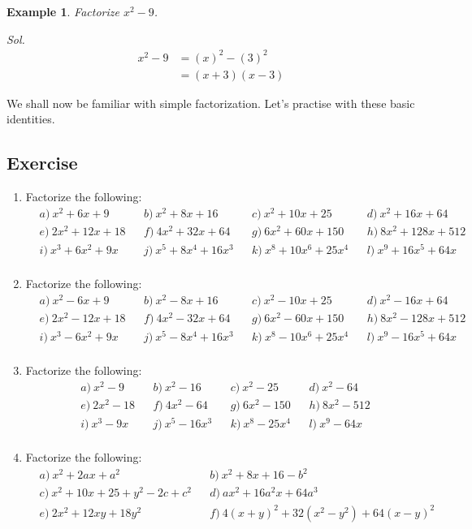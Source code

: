 \documentclass[12pt]{article}
\newtheorem{example}{Example}
\begin{document}
    \begin{example}
        Factorize $x^2-9$.
    \end{example}
    \textit{ Sol. }\begin{align*}
        x^2-9&=(x)^2-(3)^2\\
        &=(x+3)(x-3)
    \end{align*}

    We shall now be familiar with simple factorization. Let's practise with these basic identities.

    \subsection*{Exercise}
    \begin{enumerate}
        \item Factorize the following:\begin{align*}
            &a)\ x^2+6x+9&&b)\ x^2+8x+16&&c)\ x^2+10x+25&&d)\ x^2+16x+64\\
            &e)\ 2x^2+12x+18&&f)\ 4x^2+32x+64&&g)\ 6x^2+60x+150&&h)\ 8x^2+128x+512\\
            &i)\ x^3+6x^2+9x&&j)\ x^5+8x^4+16x^3&&k)\ x^8+10x^6+25x^4&&l)\ x^9+16x^5+64x\\
        \end{align*}
        \item Factorize the following:\begin{align*}
            &a)\ x^2-6x+9&&b)\ x^2-8x+16&&c)\ x^2-10x+25&&d)\ x^2-16x+64\\
            &e)\ 2x^2-12x+18&&f)\ 4x^2-32x+64&&g)\ 6x^2-60x+150&&h)\ 8x^2-128x+512\\
            &i)\ x^3-6x^2+9x&&j)\ x^5-8x^4+16x^3&&k)\ x^8-10x^6+25x^4&&l)\ x^9-16x^5+64x\\
        \end{align*}
        \item Factorize the following:\begin{align*}
            &a)\ x^2-9&&b)\ x^2-16&&c)\ x^2-25&&d)\ x^2-64\\
            &e)\ 2x^2-18&&f)\ 4x^2-64&&g)\ 6x^2-150&&h)\ 8x^2-512\\
            &i)\ x^3-9x&&j)\ x^5-16x^3&&k)\ x^8-25x^4&&l)\ x^9-64x\\
        \end{align*}
        \item Factorize the following:\begin{align*}
            &a)\ x^2+2ax+a^2&&b)\ x^2+8x+16-b^2\\
            &c)\ x^2+10x+25+y^2-2c+c^2&&d)\ ax^2+16a^2x+64a^3\\
            &e)\ 2x^2+12xy+18y^2&&f)\ 4(x+y)^2+32(x^2-y^2)+64(x-y)^2
        \end{align*}
    \end{enumerate}
\end{document}
